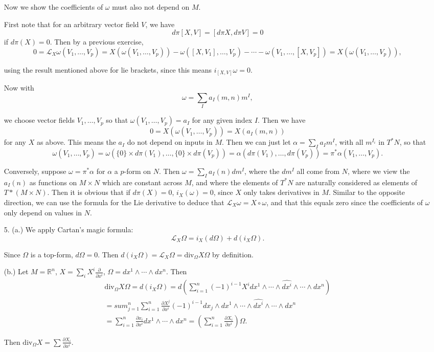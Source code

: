 \documentclass[11pt, reqno]{article}
\theoremstyle{plain}
\theoremstyle{definition}
\theoremstyle{remark}
\newcommand{\RR}{\mathbb{R}}
\begin{document}
\begin{enumerate}
    Now we show the coefficients of $\omega$ must also not depend on $M$. 

    First note that for an arbitrary vector field $V$, we have
    \[
        d\pi[X,V] = [d\pi X, d\pi V] = 0
    \]
    if $d\pi(X) = 0$. Then by a previous exercise,
    \[
        0 = \mathcal{L}_X\omega(V_1, \dots, V_p) = X(\omega(V_1,\dots, V_p)) - \omega([X,V_1], \dots, V_p)
        - \cdots - \omega(V_1, \dots, [X, V_p]) = X(\omega(V_1, \dots, V_p)),
    \]

    using the result mentioned above for lie brackets, since this means $i_{[X,V]}\omega = 0$.

    Now with 
    \[
        \omega = \sum_{I} a_I(m,n) m^I,
    \]

    we choose vector fields $V_1, \dots, V_p$ so that $\omega(V_1, \dots, V_p) = a_I$ for any given
    index $I$. Then we have
    \[
        0 = X(\omega(V_1, \dots, V_p)) = X(a_I(m,n))
    \]
    for any $X$ as above. This means the $a_I$ do not depend on inputs in $M$. Then 
    we can just let $\alpha = \sum_I a_I m^I$, with all $m^{I_i}$ in $T^*N$, so that 
    \[
        \omega(V_1, \dots, V_p) = \omega(\{0\}\times d\pi(V_1),\dots,\{0\}\times d\pi(V_p))
        = \alpha(d\pi(V_1),\dots,d\pi(V_p)) = \pi^*\alpha(V_1,\dots,V_p).
    \]
    
    Conversely, suppose $\omega = \pi^*\alpha$ for $\alpha$ a $p$-form on $N$. Then 
    $\omega = \sum_{I} a_I(n) dm^I$, where the $dm^I$ all come from $N$, where we view
    the $a_I(n)$ as functions on $M\times N$ which are constant across $M$, and where the elements
    of $T^*N$ are naturally considered as elements of $T*(M\times N)$. Then it is obvious
    that if $d\pi(X) = 0$, $i_X(\omega) = 0$, since $X$ only takes derivatives in $M$. Similar
    to the opposite direction, we can use the formula for the Lie derivative to deduce that
    $\mathcal{L}_X\omega = X\circ\omega$, and that this equals zero since the coefficients of
    $\omega$ only depend on values in $N$. 

    \item[5.] (a.) We apply Cartan's magic formula:
    \[
        \mathcal{L}_X \Omega = i_X(d\Omega) + d(i_X\Omega).
    \]

    Since $\Omega$ is a top-form, $d\Omega = 0$. Then $d(i_X \Omega) = \mathcal{L}_X \Omega = \text{div}_\Omega X \Omega$
    by definition.

    (b.) Let $M = \RR^n$, $X = \sum_{i} X^i \frac{\partial}{\partial x^i}$, $\Omega = dx^1 \wedge \cdots \wedge dx^n$.
    Then 
    \begin{align*}
        \text{div}_\Omega X \Omega = d(i_X\Omega) = d\left(\sum_{i = 1}^n (-1)^{i-1} X^i
        dx^1 \wedge \cdots \wedge \hat{dx^i}\wedge\cdots\wedge dx^n\right)\\
        = sum_{j = 1}^n \sum_{i = 1}^n \frac{\partial X^j}{\partial x^i}(-1)^{i-1} dx_j\wedge dx^1 \wedge \cdots \wedge \hat{dx^i}\wedge\cdots\wedge dx^n\\
        = \sum_{i=1}^n \frac{\partial x_i}{\partial x^i}dx^1\wedge\cdots \wedge dx^n
        = \left(\sum_{i = 1}^n \frac{\partial X_i}{\partial x^i}\right) \Omega.
    \end{align*}

    Then $\text{div}_\Omega X = \sum \frac{\partial X_i}{\partial x^i}$. 
\end{enumerate}
\end{document}

